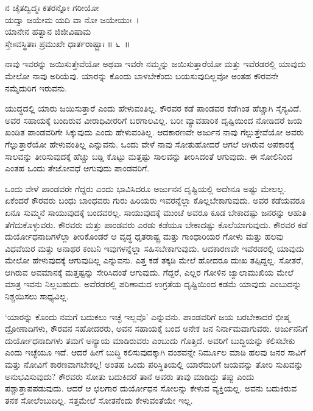 \begin{shloka}
ನ ಚೈತದ್ವಿದ್ಮಃ ಕತರನ್ನೋ ಗರೀಯೋ\\ಯದ್ವಾ ಜಯೇಮ ಯದಿ ವಾ ನೋ ಜಯೇಯುಃ~।\\ಯಾನೇನ ಹತ್ವಾನ ಜಿಜೀವಿಷಾಮ\\ಸ್ತೇsವಸ್ಥಿತಾಃ ಪ್ರಮುಖೇ ಧಾರ್ತರಾಷ್ಟ್ರಾಃ \hfill॥ ೬~॥
\end{shloka}

\begin{artha}
ನಾವು ಇವರನ್ನು ಜಯಿಸುತ್ತೇವೆಯೋ ಅಥವಾ ಇವರೇ ನಮ್ಮನ್ನು ಜಯಿಸುತ್ತಾರೆಯೋ ಮತ್ತು ಇವೆರಡರಲ್ಲಿ ಯಾವುದು ಮೇಲೋ ನಾವು ಅರಿಯೆವು. ಯಾರನ್ನು ಕೊಂದು ಬಾಳಬೇಕೆಂದು ಬಯಸುವುದಿಲ್ಲವೋ ಅಂತಹ ಕೌರವನೇ ನಮ್ಮೆದುರಿಗ ಇರುವನು.
\end{artha}

ಯುದ್ಧದಲ್ಲಿ ಯಾರು ಜಯಿಸುತ್ತಾರೆ ಎಂದು ಹೇಳುವಂತಿಲ್ಲ. ಕೌರವರ ಕಡೆ ಪಾಂಡವರ ಕಡೆಗಿಂತ ಹೆಚ್ಚಾಗಿ ಸೈನ್ಯವಿದೆ. ಅವರ ಸಹಾಯಕ್ಕೆ ಬಂದಿರುವ ವೀರಾಧಿವೀರರಿಗೆ ಬರಗಾಲವಿಲ್ಲ. ಬರೀ ವ್ಯಾವಹಾರಿಕ ದೃಷ್ಟಿಯಿಂದ ನೋಡಿದರೆ ಜಯ ಖಂಡಿತ ಪಾಂಡವರಿಗೇ ಸಿಕ್ಕುವುದು ಎಂದು ಹೇಳುವಂತಿಲ್ಲ. ಆದಕಾರಣವೇ ಅರ್ಜುನ ನಾವು ಗೆಲ್ಲುತ್ತೇವೆಯೋ ಅವರು ಗೆಲ್ಲುತ್ತಾರೆಯೋ ಹೇಳುವಂತಿಲ್ಲ ಎನ್ನುವನು. ಒಂದು ವೇಳೆ ನಾವು ಸೋತುಹೋದರೆ ಆಗಲೆ ಆಗಿರುವ ಅಪಕಾರಕ್ಕೆ ಸಾಲವನ್ನು ತೀರಿಸುವುದಕ್ಕೆ ಹೆಚ್ಚು ಬಡ್ಡಿ ಕೊಟ್ಟು ಮತ್ತಷ್ಟು ಸಾಲವನ್ನು ತೀರಿಸಿದಂತೆ ಆಗುವುದು. ಈ ಸೋಲಿನಿಂದ ಎಂತಹ ಒಂದು ತೇಜೋವಧೆ ಆಗುವುದು ಪಾಂಡವರಿಗೆ.

ಒಂದು ವೇಳೆ ಪಾಂಡವರೇ ಗೆದ್ದರು ಎಂದು ಭಾವಿಸಿದರೂ ಅರ್ಜುನನ ದೃಷ್ಟಿಯಲ್ಲಿ ಅದೇನೂ ಅಷ್ಟು ಮೇಲಲ್ಲ. ಏಕೆಂದರೆ ಕೌರವರು ಬಂಧು ಬಾಂಧವರು ಗುರು ಹಿರಿಯರು ಇವರನ್ನೆಲ್ಲಾ ಕೊಲ್ಲಬೇಕಾಗುವುದು. ಅವರ ಕಡೆಯವರೂ ಏನೂ ಸುಮ್ಮನೆ ಸಾಯುವುದಕ್ಕೆ ಬಂದವರಲ್ಲ. ಸಾಯುವುದಕ್ಕೆ ಮುಂಚೆ ಅವರೂ ಕೂಡ ಬೇಕಾದಷ್ಟು ಜನರನ್ನು ಆಹುತಿ ತೆಗೆದುಕೊಳ್ಳುವರು. ಕೌರವರು ಮತ್ತು ಪಾಂಡವರು ಎರಡು ಕಡೆಯೂ ಬೇಕಾದಷ್ಟು ಕೊಲೆಯಾಗುವುದು. ಕೌರವರ ಕಡೆ ದುರ್ಯೋಧನಾದಿಗಳೆಲ್ಲಾ ತೀರಿಕೊಂಡರೆ ಆ ವೃದ್ಧ ಧೃತರಾಷ್ಟ್ರ ಮತ್ತು ಗಾಂಧಾರಿಯರ ಗೋಳು ಮತ್ತು ಹಲವು ವಿಧವೆಯರ ಮತ್ತು ಅನಾಥರ ಕಂಬನಿ ಇವುಗಳನ್ನೆಲ್ಲಾ ಸಹಿಸಬೇಕಾಗುವುದು. ಆದಕಾರಣವೇ ಇವೆರಡರಲ್ಲಿ ಯಾವುದು ಮೇಲೋ ಹೇಳುವುದಕ್ಕೆ ಆಗುವುದಿಲ್ಲ ಎನ್ನುವನು. ಎತ್ತ ಕಡೆ ತಕ್ಕಡಿ ಮೇಲೆ ಹೋದರೂ ದುಃಖ ತಪ್ಪಿದ್ದಲ್ಲ. ಸೋತರೆ, ಆಗಿರುವ ಅವಮಾನಕ್ಕೆ ಮತ್ತಷ್ಟನ್ನು ಸೇರಿಸಿದಂತೆ ಆಗುವುದು. ಗೆದ್ದರೆ, ಎಲ್ಲರ ಗೋಳಿನ ಜ್ವಾಲಾಮುಖಿಯ ಮೇಲೆ ಮಾತ್ರ ಇವನು ನಿಲ್ಲಬಹುದು. ಅವೆರಡರಲ್ಲಿ ಪರಿಣಾಮದ ಉಗ್ರತೆಯ ದೃಷ್ಟಿಯಿಂದ ಕಡಮೆ ಯಾವುದು ಎಂಬುದನ್ನು ನಿಶ್ಚಯಿಸಲು ಸಾಧ್ಯವಿಲ್ಲ.

‘ಯಾರನ್ನು ಕೊಂದು ನಮಗೆ ಬದುಕಲು ಇಚ್ಛೆ ಇಲ್ಲವೊ’ ಎನ್ನುವನು. ಪಾಂಡವರಿಗೆ ಜಯ ಬರಬೇಕಾದರೆ ಭೀಷ್ಮ ದ್ರೋಣಾದಿಗಳು, ಕೌರವನ ಸಹೋದರರು, ಅವನ ಸಹಾಯಕ್ಕೆ ಬಂದ ಅನೇಕ ಜನ ನಿರ್ನಾಮವಾಗುವರು. ಅರ್ಜುನನಿಗೆ ದುರ್ಯೋಧನಾದಿಗಳು ತಮಗೆ ಅನ್ಯಾಯ ಮಾಡಿರುವರು ಎಂಬುದು ಗೊತ್ತಿದೆ. ಅವರಿಗೆ ಬುದ್ಧಿಯನ್ನು ಕಲಿಸಬೇಕು ಎಂದು ಇಚ್ಛೆಯೂ ಇದೆ. ಆದರೆ ಹೀಗೆ ಬುದ್ಧಿ ಕಲಿಸುವುದಕ್ಕಾಗಿ ವಂಶವನ್ನೇ ನಿರ್ಮೂಲ ಮಾಡಿ ಹಲವು ಜನರ ಸಾವಿಗೆ ಮತ್ತು ನೋವಿಗೆ ಕಾರಣವಾಗಬೇಕಲ್ಲ! ಅಂತಹ ಒಂದು ಪರಿಸ್ಥಿತಿಯಲ್ಲಿ ಯಾರೆದುರಿಗೆ ಜಯವನ್ನು ತೋರಿ ಸುಖವನ್ನು ಅನುಭವಿಸುವುದು? ಕೌರವರು ಸೋತು ಬದುಕಿದರೆ ತಾನೆ ಅವರು ತಾವು ಮಾಡಿದ್ದು ತಪ್ಪು ಎಂದು ಪಶ್ಚಾತ್ತಾಪಪಡುವುದು. ಆದರೆ ಆ ಛಲಗಾರ ದುರ್ಯೋಧನ ಸೋಲನ್ನು ಕೇಳುವ ವ್ಯಕ್ತಿಯಲ್ಲ. ಅವನು ಬದುಕಿರುವ ತನಕ ಸೋಲೆಂಬುದಿಲ್ಲ. ಸತ್ತಮೇಲೆ ಸೋತನೆಂದು ಕೇಳುವಂತೆಯೇ ಇಲ್ಲ.

